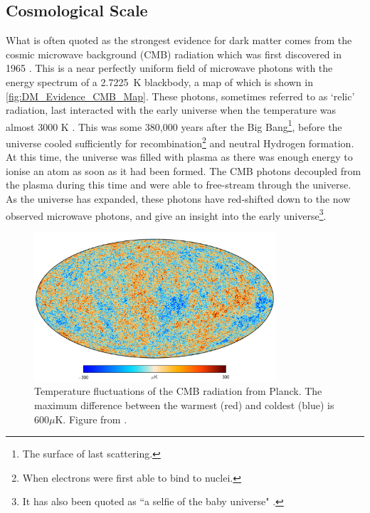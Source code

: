 \subsection{Cosmological Scale}

\par
What is often quoted as the strongest evidence for dark matter comes from the cosmic microwave background (CMB) radiation which was first discovered in 1965 \cite{cmb_origins_ref}.
This is a near perfectly uniform field of microwave photons with the energy spectrum of a 2.7225~K blackbody, a map of which is shown in \autoref{fig:DM_Evidence_CMB_Map}.
These photons, sometimes referred to as `relic' radiation, last interacted with the early universe when the temperature was almost 3000 K \cite{bigbang_nucleosynthesis_ref}.
This was some 380,000 years after the Big Bang\footnote{The surface of last scattering.}, before the universe cooled sufficiently for recombination\footnote{When electrons were first able to bind to nuclei.} and neutral Hydrogen formation.
At this time, the universe was filled with plasma as there was enough energy to ionise an atom as soon as it had been formed.
The CMB photons decoupled from the plasma during this time and were able to free-stream through the universe.
As the universe has expanded, these photons have red-shifted down to the now observed microwave photons, and give an insight into the early universe\footnote{It has also been quoted as ``a selfie of the baby universe" \cite{marisarthurs_thesis_ref}.}.

\begin{figure}[]%
    \centering
    \includegraphics[width=0.8\textwidth]{Figures/DarkMatterEvidence/cmb_radiation.png}
    \caption[Temperature fluctuations of the CMB radiation]{Temperature fluctuations of the CMB radiation from Planck.
             The maximum difference between the warmest (red) and coldest (blue) is 600$\mu$K.
             Figure from \cite{plank_result_ref}.}
    \label{fig:DM_Evidence_CMB_Map}
\end{figure}

